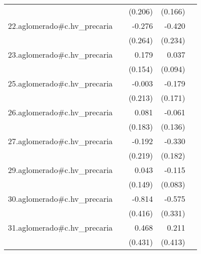 {\begin{longtable}{l*{4}{D{.}{.}{-1}}}
            &                     &     (0.206)         &     (0.166)         &                     \\
\addlinespace
22.aglomerado#c.hv\_precaria&                     &      -0.276         &      -0.420         &                     \\
            &                     &     (0.264)         &     (0.234)         &                     \\
\addlinespace
23.aglomerado#c.hv\_precaria&                     &       0.179         &       0.037         &                     \\
            &                     &     (0.154)         &     (0.094)         &                     \\
\addlinespace
25.aglomerado#c.hv\_precaria&                     &      -0.003         &      -0.179         &                     \\
            &                     &     (0.213)         &     (0.171)         &                     \\
\addlinespace
26.aglomerado#c.hv\_precaria&                     &       0.081         &      -0.061         &                     \\
            &                     &     (0.183)         &     (0.136)         &                     \\
\addlinespace
27.aglomerado#c.hv\_precaria&                     &      -0.192         &      -0.330         &                     \\
            &                     &     (0.219)         &     (0.182)         &                     \\
\addlinespace
29.aglomerado#c.hv\_precaria&                     &       0.043         &      -0.115         &                     \\
            &                     &     (0.149)         &     (0.083)         &                     \\
\addlinespace
30.aglomerado#c.hv\_precaria&                     &      -0.814         &      -0.575         &                     \\
            &                     &     (0.416)         &     (0.331)         &                     \\
\addlinespace
31.aglomerado#c.hv\_precaria&                     &       0.468         &       0.211         &                     \\
            &                     &     (0.431)         &     (0.413)         &                     \\

\end{longtable}}
